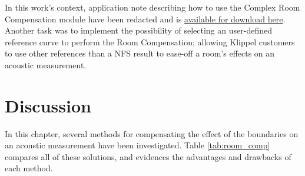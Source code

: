 \documentclass{report}
\begin{document}
In this work's context, application note describing how to use the Complex Room Compensation module have been redacted and is \href{https://www.dropbox.com/s/vqfezho53hyu7xg/AN_00_Complex_Room_Compensation.pdf?dl=0}{available for download \underline{here}}.\\
 Another task was to implement the possibility of selecting an user-defined reference curve to perform the Room Compensation; allowing Klippel customers to use other references than a NFS result to ease-off a room's effects on an acoustic measurement.

\section{Discussion}

In this chapter, several methods for compensating the effect of the boundaries on an acoustic measurement have been  investigated. Table \ref{tab:room_comp} compares all of these solutions, and evidences the advantages and drawbacks of each method. 

\vspace{0.5cm}
\end{document}

